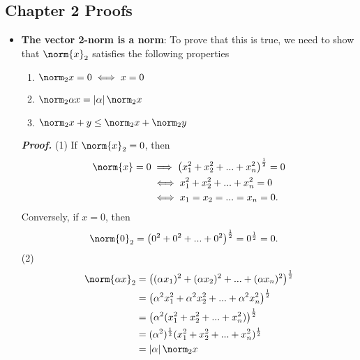 \documentclass{report}
\begin{document}
    \pagebreak 
    \subsection{Chapter 2 Proofs}
    \begin{itemize}
        \item \textbf{The vector 2-norm is a norm}: To prove that this is true, we need to show that $\norm{x}_{2}$ satisfies the following properties
            \begin{enumerate}
                \item $\norm_{2}{x} = 0 \iff x = 0$
                \item $\norm_{2}{\alpha x} = \left\lvert \alpha \right\rvert \norm_{2}{x} $
                \item $\norm_{2}{x + y} \leq \norm_{2}{x}  + \norm_{2}{y} $
            \end{enumerate}
            \bigbreak \noindent 
            \textbf{\textit{Proof.}} (1) If $\norm{x}_{2} = 0$, then
            \begin{align*}
                \norm{x} = 0 &\implies \left(x_{1}^{2} + x_{2}^{2} + ... + x_{n}^{2}\right)^{\frac{1}{2}} = 0 \\
                             &\iff x_{1}^{2} + x_{2}^{2} + ... + x_{n}^{2} = 0 \\
                             &\iff x_{1} = x_{2} =  ... = x_{n} = 0
            .\end{align*}
            Conversely, if $x=0$, then
            \begin{align*}
                \norm{0}_{2} &= \left(0^{2} + 0^{2} + ... + 0^{2}\right)^{\frac{1}{2}} = 0^{\frac{1}{2}} = 0
            .\end{align*}
            (2)
            \begin{align*}
                \norm{\alpha x}_{2} &= \left((\alpha x_{1})^{2} + (\alpha x_{2})^{2} + ... + (\alpha x_{n})^{2}\right)^{\frac{1}{2}} \\
                                &= \left(\alpha^{2} x_{1}^{2} + \alpha^{2} x_{2}^{2} + ... + \alpha^{2} x_{n}^{2}\right)^{\frac{1}{2}} \\
                                &= \left(\alpha^{2}(x_{1}^{2} + x_{2}^{2} + ... + x_{n}^{2})\right)^{\frac{1}{2}} \\
                                &= (\alpha^{2})^{\frac{1}{2}}  (x_{1}^{2} + x_{2}^{2} + ... + x_{n}^{2})^{\frac{1}{2}} \\
                                &= \left\lvert \alpha \right\rvert \norm_{2}{x}

\end{align*}
\end{itemize}
\end{document}
